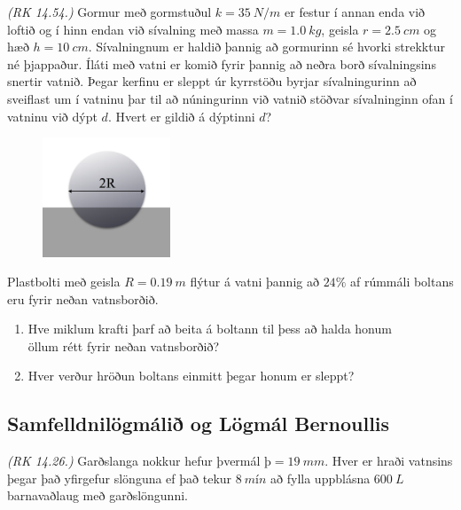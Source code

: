 \begin{enumerate}[label = \textbf{Dæmi \thechapter.\arabic*.}]
\item \textit{(RK 14.54.)} Gormur með gormstuðul $k = \SI{35}{N/m}$ er festur í annan enda við loftið og í hinn endan við sívalning með massa $m = \SI{1.0}{kg}$,  geisla $r = \SI{2.5}{cm}$ og hæð $h = \SI{10}{cm}$. Sívalningnum er haldið þannig að gormurinn sé hvorki strekktur né þjappaður. Íláti með vatni er komið fyrir þannig að neðra borð sívalningsins snertir vatnið. Þegar kerfinu er sleppt úr kyrrstöðu byrjar sívalningurinn að sveiflast um í vatninu þar til að núningurinn við vatnið stöðvar sívalninginn ofan í vatninu við dýpt $d$. Hvert er gildið á dýptinni $d$?

\begin{minipage}{\linewidth}

\begin{figure}
\vspace{-1cm}
\includegraphics[width=1.5in]{images/kula.png}
\end{figure}

\item Plastbolti með geisla $R = \SI{0.19}{m}$ flýtur á vatni þannig að $24 \%$ af rúmmáli boltans eru fyrir neðan vatnsborðið.
\end{minipage}
\begin{enumerate}[label = \textbf{(\alph*)}]
    \item Hve miklum krafti þarf að beita á boltann til þess að halda honum \\ öllum rétt fyrir neðan vatnsborðið?
    
    \item Hver verður hröðun boltans einmitt þegar honum er sleppt?
\end{enumerate}


\subsection*{Samfelldnilögmálið og Lögmál Bernoullis}

\item \textit{(RK 14.26.)} Garðslanga nokkur hefur þvermál $þ = \SI{19}{mm}$. Hver er hraði vatnsins þegar það yfirgefur slönguna ef það tekur $\SI{8}{mín}$ að fylla uppblásna $\SI{600}{L}$ barnavaðlaug með garðslöngunni.



\end{enumerate}
